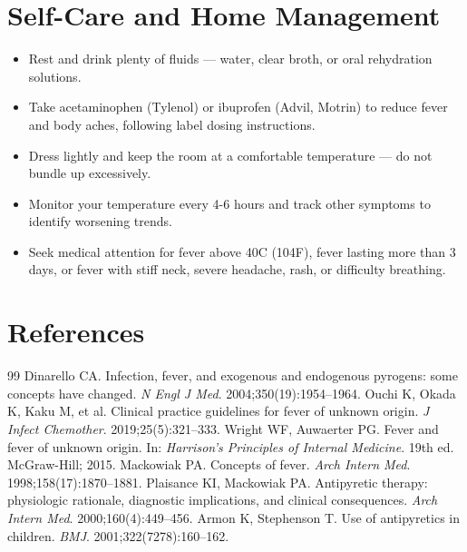 \section*{Self-Care and Home Management}
\begin{itemize}
  \item Rest and drink plenty of fluids — water, clear broth, or oral rehydration solutions.
  \item Take acetaminophen (Tylenol) or ibuprofen (Advil, Motrin) to reduce fever and body aches, following label dosing instructions.
  \item Dress lightly and keep the room at a comfortable temperature — do not bundle up excessively.
  \item Monitor your temperature every 4-6 hours and track other symptoms to identify worsening trends.
  \item Seek medical attention for fever above 40\textdegree{}C (104\textdegree{}F), fever lasting more than 3 days, or fever with stiff neck, severe headache, rash, or difficulty breathing.
\end{itemize}

\section*{References}
\begin{thebibliography}{99}
Dinarello CA. Infection, fever, and exogenous and endogenous pyrogens: some concepts have changed. \textit{N Engl J Med}. 2004;350(19):1954--1964.
Ouchi K, Okada K, Kaku M, et al. Clinical practice guidelines for fever of unknown origin. \textit{J Infect Chemother}. 2019;25(5):321--333.
Wright WF, Auwaerter PG. Fever and fever of unknown origin. In: \textit{Harrison's Principles of Internal Medicine}. 19th ed. McGraw-Hill; 2015.
Mackowiak PA. Concepts of fever. \textit{Arch Intern Med}. 1998;158(17):1870--1881.
Plaisance KI, Mackowiak PA. Antipyretic therapy: physiologic rationale, diagnostic implications, and clinical consequences. \textit{Arch Intern Med}. 2000;160(4):449--456.
Armon K, Stephenson T. Use of antipyretics in children. \textit{BMJ}. 2001;322(7278):160--162.
\end{thebibliography}
